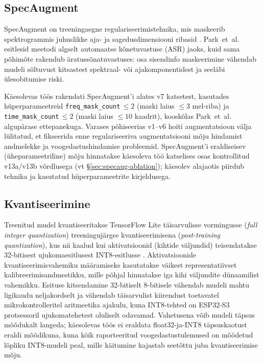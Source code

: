 \subsection{SpecAugment}
\label{subsec:specaugment}

SpecAugment on treeningaegne regulariseerimistehnika, mis maskeerib spektrogrammis juhuslikke aja- ja sagedusdimensiooni ribasid \cite{park2019specaugment}. Park~et~al. esitlesid meetodi algselt automaatse kõnetuvastuse (ASR) jaoks, kuid sama põhimõte rakendub äratussõnatuvastuses: osa sisendinfo maskeerimine vähendab mudeli sõltuvust kitsastest spektraal- või ajakomponentidest ja seeläbi ülesobitumise riski.

Käesolevas töös rakendati SpecAugment'i alates v7 katsetest, kasutades hüperparameetreid \texttt{freq\_mask\_count}\,$\le 2$ (maski laius $\le 3$ mel-riba) ja \texttt{time\_mask\_count}\,$\le 2$ (maski laius $\le 10$ kaadrit), kooskõlas Park~et~al.\ \cite{park2019specaugment} algupärase ettepanekuga. Varases põhiseerias v1--v6 hoiti augmentatsioon välja lülitatud, et fikseerida enne regulariseeriva augmentatsiooni mõju hindamist andmelekke ja voogedastushindamise probleemid. SpecAugment'i eraldiseisev (üheparameetriline) mõju hinnatakse käesoleva töö katselises osas kontrollitud v13a/v13b võrdlusega (vt §\ref{sec:specaug-ablation}); käesolev alajaotis piirdub tehnika ja kasutatud hüperparameetrite kirjeldusega.

\subsection{Kvantiseerimine}
\label{subsec:quantization}

Treenitud mudel kvantiseeritakse TensorFlow Lite täisarvulisse vormingusse (\emph{full integer quantization}) treeningujärgse kvantiseerimisena (\emph{post-training quantization}), kus nii kaalud kui aktivatsioonid (kihtide väljundid) teisendatakse 32-bitisest ujukomaesitlusest INT8-esitlusse \cite{tensorflow2015,jacob2018quantization}. Aktivatsioonide kvantiseerimisvahemiku määramiseks kasutatakse väikest representatiivset kalibreerimisandmestikku, mille põhjal hinnatakse iga kihi väljundite dünaamilist vahemikku. Esituse kitsendamine 32-bitiselt 8-bitisele vähendab mudeli mahtu ligikaudu neljakordselt ja vähendab täisarvulist kiirendust toetavatel mikrokontrolleritel aritmeetika ajakulu, kuna INT8-tehted on ESP32-S3 protsessoril ujukomatehetest oluliselt odavamad. Vahetusena võib mudeli täpsus mõõdukalt langeda; käesolevas töös ei eraldata float32-ja-INT8 täpsuskaotust eraldi mõõdikuna, kuna kõik raporteeritud voogedastustulemused on mõõdetud lõpliku INT8-mudeli peal, mille käitumine kajastab seetõttu juba kvantiseerimise mõju.

